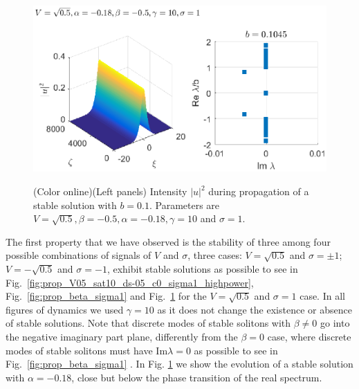\documentclass[aps,pre,showpacs,twocolumn]{revtex4}
\begin{document}
\begin{figure}[ht]
\begin{center}
\scalebox{.68} {\includegraphics{prop_V05_sat10_ds-05_c-018_sigma1.eps}}
\end{center}
\caption{(Color online)(Left panels) Intensity $|u|^2$ during propagation of a stable solution with $b=0.1$. Parameters are $V=\sqrt{0.5},\beta=-0.5,\alpha=-0.18,\gamma=10$ and $\sigma=1$.}%
\label{fig:prop_V05_sat10_ds-05_c-018_sigma1}%
\end{figure}
The first property that we have observed is the stability of  three among four possible combinations of signals of $V$ and $\sigma$, three cases: $V=\sqrt{0.5}$ and $\sigma=\pm1$;$V=-\sqrt{0.5}$ and $\sigma=-1$, exhibit stable solutions as possible to see in Fig.~\ref{fig:prop_V05_sat10_ds-05_c0_sigma1_highpower}, Fig.~\ref{fig:prop_beta_sigma1} and Fig.~\ref{fig:prop_V05_sat10_ds-05_c-018_sigma1} for the $V=\sqrt{0.5}$ and $\sigma=1$ case. In all figures of dynamics we used $\gamma=10$ as it does not change the existence or absence of stable solutions. Note that discrete modes of stable solitons with $\beta\neq 0$ go into the negative imaginary part plane, differently from the $\beta=0$ case, where discrete modes of stable solitons must have $\text{Im}\lambda=0$ as possible to see in Fig.~\ref{fig:prop_beta_sigma1} . In Fig. \ref{fig:prop_V05_sat10_ds-05_c-018_sigma1} we show the evolution of a stable solution with $\alpha=-0.18$, close but below the phase transition of the real spectrum. 
\end{document}
